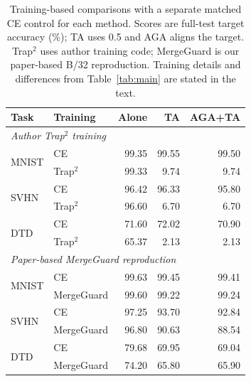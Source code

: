 \begin{table}[!t]
\centering
\small
\setlength{\tabcolsep}{3pt}
\caption{Training-based comparisons with a separate matched CE control for each method. Scores are full-test target accuracy (\%); TA uses 0.5 and AGA aligns the target. Trap$^2$ uses author training code; MergeGuard is our paper-based B/32 reproduction. Training details and differences from Table~\ref{tab:main} are stated in the text.}
\label{tab:training-baseline}
\begin{tabular}{llrrr}
\toprule
Task & Training & Alone & TA & AGA+TA \\
\midrule
\multicolumn{5}{l}{\textit{Author Trap$^2$ training}} \\
\multirow{2}{*}{MNIST} & CE & 99.35 & 99.55 & 99.50 \\
 & Trap$^2$ & 99.33 & 9.74 & 9.74 \\
\midrule
\multirow{2}{*}{SVHN} & CE & 96.42 & 96.33 & 95.80 \\
 & Trap$^2$ & 96.60 & 6.70 & 6.70 \\
\midrule
\multirow{2}{*}{DTD} & CE & 71.60 & 72.02 & 70.90 \\
 & Trap$^2$ & 65.37 & 2.13 & 2.13 \\
\midrule
\multicolumn{5}{l}{\textit{Paper-based MergeGuard reproduction}} \\
\multirow{2}{*}{MNIST} & CE & 99.63 & 99.45 & 99.41 \\
 & MergeGuard & 99.60 & 99.22 & 99.24 \\
\midrule
\multirow{2}{*}{SVHN} & CE & 97.25 & 93.70 & 92.84 \\
 & MergeGuard & 96.80 & 90.63 & 88.54 \\
\midrule
\multirow{2}{*}{DTD} & CE & 79.68 & 69.95 & 69.04 \\
 & MergeGuard & 74.20 & 65.80 & 65.90 \\
\bottomrule
\end{tabular}
\end{table}

